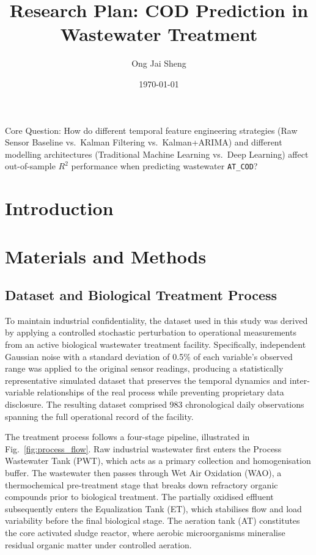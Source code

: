 \documentclass[conference]{IEEEtran}
\title{Research Plan: COD Prediction in Wastewater Treatment}
\author{Ong Jai Sheng}
\date{\today}
\begin{document}
\maketitle
\onehalfspacing

Core Question: How do different temporal feature engineering strategies (Raw Sensor Baseline vs.\ Kalman Filtering vs.\ Kalman+ARIMA) and different modelling architectures (Traditional Machine Learning vs.\ Deep Learning) affect out-of-sample $R^2$ performance when predicting wastewater \texttt{AT\_COD}?


\section{Introduction}


\section{Materials and Methods}

\subsection{Dataset and Biological Treatment Process}

To maintain industrial confidentiality, the dataset used in this study was derived by applying a controlled stochastic perturbation to operational measurements from an active biological wastewater treatment facility. Specifically, independent Gaussian noise with a standard deviation of 0.5\% of each variable's observed range was applied to the original sensor readings, producing a statistically representative simulated dataset that preserves the temporal dynamics and inter-variable relationships of the real process while preventing proprietary data disclosure. The resulting dataset comprised 983 chronological daily observations spanning the full operational record of the facility.

The treatment process follows a four-stage pipeline, illustrated in Fig.~\ref{fig:process_flow}. Raw industrial wastewater first enters the Process Wastewater Tank (PWT), which acts as a primary collection and homogenisation buffer. The wastewater then passes through Wet Air Oxidation (WAO), a thermochemical pre-treatment stage that breaks down refractory organic compounds prior to biological treatment. The partially oxidised effluent subsequently enters the Equalization Tank (ET), which stabilises flow and load variability before the final biological stage. The aeration tank (AT) constitutes the core activated sludge reactor, where aerobic microorganisms mineralise residual organic matter under controlled aeration.
\end{document}
